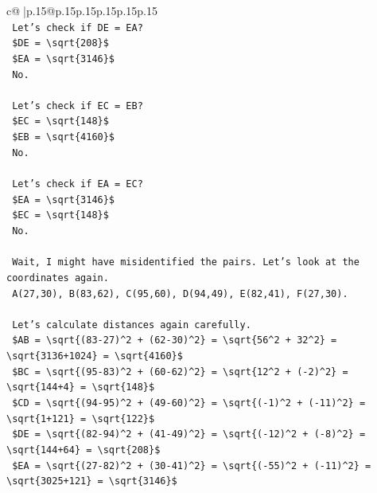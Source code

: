 \documentclass{article}
\begin{document}
{\begin{supertabular}{c@{$\;$}|p{.15\linewidth}@{}p{.15\linewidth}p{.15\linewidth}p{.15\linewidth}p{.15\linewidth}p{.15\linewidth}}
{{{\\ 
\texttt{    Let's check if DE = EA?} \\
\texttt{    \$DE = \textbackslash{}sqrt\{208\}\$} \\
\texttt{    \$EA = \textbackslash{}sqrt\{3146\}\$} \\
\texttt{    No.} \\
\\ 
\texttt{    Let's check if EC = EB?} \\
\texttt{    \$EC = \textbackslash{}sqrt\{148\}\$} \\
\texttt{    \$EB = \textbackslash{}sqrt\{4160\}\$} \\
\texttt{    No.} \\
\\ 
\texttt{    Let's check if EA = EC?} \\
\texttt{    \$EA = \textbackslash{}sqrt\{3146\}\$} \\
\texttt{    \$EC = \textbackslash{}sqrt\{148\}\$} \\
\texttt{    No.} \\
\\ 
\texttt{    Wait, I might have misidentified the pairs. Let's look at the coordinates again.} \\
\texttt{    A(27,30), B(83,62), C(95,60), D(94,49), E(82,41), F(27,30).} \\
\\ 
\texttt{    Let's calculate distances again carefully.} \\
\texttt{    \$AB = \textbackslash{}sqrt\{(83{-}27)\^{}2 + (62{-}30)\^{}2\} = \textbackslash{}sqrt\{56\^{}2 + 32\^{}2\} = \textbackslash{}sqrt\{3136+1024\} = \textbackslash{}sqrt\{4160\}\$} \\
\texttt{    \$BC = \textbackslash{}sqrt\{(95{-}83)\^{}2 + (60{-}62)\^{}2\} = \textbackslash{}sqrt\{12\^{}2 + ({-}2)\^{}2\} = \textbackslash{}sqrt\{144+4\} = \textbackslash{}sqrt\{148\}\$} \\
\texttt{    \$CD = \textbackslash{}sqrt\{(94{-}95)\^{}2 + (49{-}60)\^{}2\} = \textbackslash{}sqrt\{({-}1)\^{}2 + ({-}11)\^{}2\} = \textbackslash{}sqrt\{1+121\} = \textbackslash{}sqrt\{122\}\$} \\
\texttt{    \$DE = \textbackslash{}sqrt\{(82{-}94)\^{}2 + (41{-}49)\^{}2\} = \textbackslash{}sqrt\{({-}12)\^{}2 + ({-}8)\^{}2\} = \textbackslash{}sqrt\{144+64\} = \textbackslash{}sqrt\{208\}\$} \\
\texttt{    \$EA = \textbackslash{}sqrt\{(27{-}82)\^{}2 + (30{-}41)\^{}2\} = \textbackslash{}sqrt\{({-}55)\^{}2 + ({-}11)\^{}2\} = \textbackslash{}sqrt\{3025+121\} = \textbackslash{}sqrt\{3146\}\$} \\
}}}
\end{supertabular}}
\end{document}
